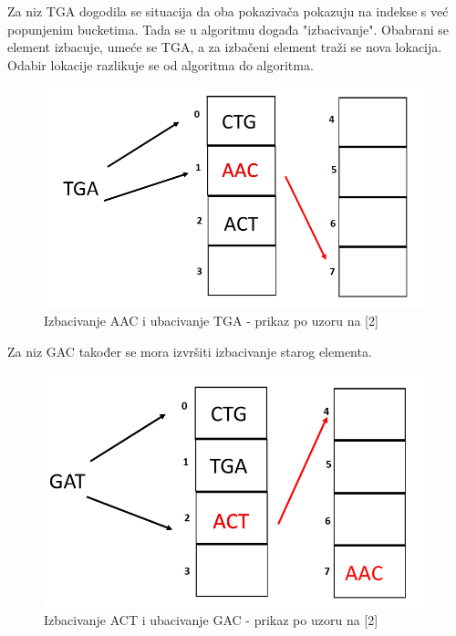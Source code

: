 \documentclass[times, utf8, seminar, numeric]{fer}
\begin{document}
Za niz TGA dogodila se situacija da oba pokazivača pokazuju na indekse s već popunjenim bucketima. Tada se u algoritmu događa "izbacivanje". Obabrani se element izbacuje, umeće se TGA, a za izbačeni element traži se nova lokacija. Odabir lokacije razlikuje se od algoritma do algoritma.

\begin{figure}[H]
  \centering
  \setlength{\intextsep}{5pt}
  \includegraphics[scale = 0.4]{images/swap1.png}
  \caption{Izbacivanje AAC i ubacivanje TGA - prikaz po uzoru na [2]}
  \label{fig_swap1}
\end{figure}

Za niz GAC također se mora izvršiti izbacivanje starog elementa. 

\begin{figure}[H]
  \centering
  \setlength{\intextsep}{5pt}
  \includegraphics[scale = 0.4]{images/swap2.png}
  \caption{Izbacivanje ACT i ubacivanje GAC - prikaz po uzoru na [2]}
  \label{fig_swap2}
\end{figure}
\end{document}
